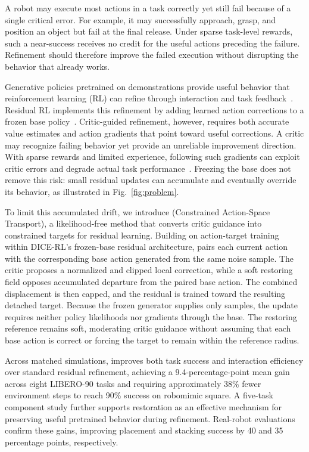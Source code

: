 A robot may execute most actions in a task correctly yet still fail because of a single critical error. For example, it may successfully approach, grasp, and position an object but fail at the final release. Under sparse task-level rewards, such a near-success receives no credit for the useful actions preceding the failure. Refinement should therefore improve the failed execution without disrupting the behavior that already works.

Generative policies pretrained on demonstrations provide useful behavior that reinforcement learning (RL) can refine through interaction and task feedback~\cite{ren2024dppo,reinflow2025}. Residual RL implements this refinement by adding learned action corrections to a frozen base policy~\cite{dicerl2026}. Critic-guided refinement, however, requires both accurate value estimates and action gradients that point toward useful corrections. A critic may recognize failing behavior yet provide an unreliable improvement direction. With sparse rewards and limited experience, following such gradients can exploit critic errors and degrade actual task performance~\cite{fujimoto2018td3,fujimoto2019bcq}. Freezing the base does not remove this risk: small residual updates can accumulate and eventually override its behavior, as illustrated in Fig.~\ref{fig:problem}.



To limit this accumulated drift, we introduce \method{} (Constrained Action-Space Transport), a likelihood-free method that converts critic guidance into constrained targets for residual learning. Building on action-target training~\cite{dipo2024,psenka2024qsm} within DICE-RL's frozen-base residual architecture, \method{} pairs each current action with the corresponding base action generated from the same noise sample. The critic proposes a normalized and clipped local correction, while a soft restoring field opposes accumulated departure from the paired base action. The combined displacement is then capped, and the residual is trained toward the resulting detached target. Because the frozen generator supplies only samples, the update requires neither policy likelihoods nor gradients through the base. The restoring reference remains soft, moderating critic guidance without assuming that each base action is correct or forcing the target to remain within the reference radius.

Across matched simulations, \method{} improves both task success and interaction efficiency over standard residual refinement, achieving a 9.4-percentage-point mean gain across eight LIBERO-90 tasks and requiring approximately 38\% fewer environment steps to reach 90\% success on robomimic square. A five-task component study further supports restoration as an effective mechanism for preserving useful pretrained behavior during refinement. Real-robot evaluations confirm these gains, improving placement and stacking success by 40 and 35 percentage points, respectively.



